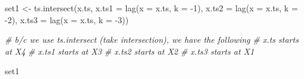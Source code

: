 \documentclass[
]{book}
\newenvironment{Shaded}{\begin{snugshade}}{\end{snugshade}}
\newcommand{\AttributeTok}[1]{\textcolor[rgb]{0.77,0.63,0.00}{#1}}
\newcommand{\CommentTok}[1]{\textcolor[rgb]{0.56,0.35,0.01}{\textit{#1}}}
\newcommand{\DecValTok}[1]{\textcolor[rgb]{0.00,0.00,0.81}{#1}}
\newcommand{\FunctionTok}[1]{\textcolor[rgb]{0.00,0.00,0.00}{#1}}
\newcommand{\NormalTok}[1]{#1}
\newcommand{\OtherTok}[1]{\textcolor[rgb]{0.56,0.35,0.01}{#1}}
\newcommand{\SpecialCharTok}[1]{\textcolor[rgb]{0.00,0.00,0.00}{#1}}
\theoremstyle{definition}
\theoremstyle{definition}
\theoremstyle{definition}
\theoremstyle{definition}
\theoremstyle{remark}
\begin{document}
\begin{Shaded}
\begin{Highlighting}[]
\NormalTok{set1 }\OtherTok{\textless{}{-}} \FunctionTok{ts.intersect}\NormalTok{(x.ts, }\AttributeTok{x.ts1 =} \FunctionTok{lag}\NormalTok{(}\AttributeTok{x =}\NormalTok{ x.ts, }\AttributeTok{k =} \SpecialCharTok{{-}}\DecValTok{1}\NormalTok{), }\AttributeTok{x.ts2 =} \FunctionTok{lag}\NormalTok{(}\AttributeTok{x =}\NormalTok{ x.ts, }\AttributeTok{k =} \SpecialCharTok{{-}}\DecValTok{2}\NormalTok{), }\AttributeTok{x.ts3 =} \FunctionTok{lag}\NormalTok{(}\AttributeTok{x =}\NormalTok{ x.ts, }\AttributeTok{k =} \SpecialCharTok{{-}}\DecValTok{3}\NormalTok{))}

\CommentTok{\# b/c we use ts.intersect (take intersection), we have the following}
\CommentTok{\# x.ts starts at X4}
\CommentTok{\# x.ts1 starts at X3}
\CommentTok{\# x.ts2 starts at X2}
\CommentTok{\# x.ts3 starts at X1}
  
\NormalTok{set1}
\end{Highlighting}
\end{Shaded}
\end{document}
